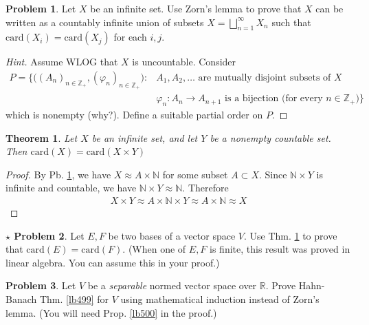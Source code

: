 \documentclass[12pt,b5paper,notitlepage]{article}
\theoremstyle{definition}
\newtheorem{prob}{\color{red}Problem}[section]
\newtheorem{sprob}[prob]{\color{red}$\star$ Problem}
\theoremstyle{plain}
\newtheorem{thm}[df]{Theorem}
\newcommand{\Nbb}{\mathbb N}
\newcommand{\Zbb}{\mathbb Z}
\newcommand{\Rbb}{\mathbb R}
\newcommand{\card}{\mathrm{card}}
\numberwithin{equation}{section}
\begin{document}
\begin{prob}\label{lb496}
Let $X$ be an infinite set. Use Zorn's lemma to prove that $X$ can be written as a countably infinite union  of subsets $X=\bigsqcup_{n=1}^\infty X_n$ such that $\card(X_i)=\card(X_j)$ for each $i,j$.
\end{prob}


\begin{proof}[Hint]
Assume WLOG that $X$ is uncountable. Consider
\begin{align*}
P=\Big\{\big((A_n)_{n\in\Zbb_+},(\varphi_n)_{n\in\Zbb_+} \big):&A_1,A_2,\dots\text{ are mutually disjoint subsets of }X\\
&\varphi_n:A_n\rightarrow A_{n+1}\text{ is a bijection (for every $n\in\Zbb_+$)}\Big\}
\end{align*}
which is nonempty (why?). Define a suitable partial order on $P$.
\end{proof}



\begin{thm}\label{lb497}
Let $X$ be an infinite set, and let $Y$ be a nonempty countable set. Then $\card(X)=\card(X\times Y)$
\end{thm}

\begin{proof}
By Pb. \ref{lb496}, we have $X\approx A\times\Nbb$ for some subset $A\subset X$. Since  $\Nbb\times Y$ is infinite and countable, we have $\Nbb\times Y\approx \Nbb$. Therefore
\begin{align*}
X\times Y\approx A\times \Nbb\times Y\approx A\times \Nbb\approx X
\end{align*}
\end{proof}


\begin{sprob}
Let $E,F$ be two bases of a vector space $V$. Use Thm. \ref{lb497} to prove that $\card(E)=\card(F)$. (When one of $E,F$ is finite, this result was proved in linear algebra. You can assume this in your proof.)
\end{sprob}

\begin{prob}\label{lb501}
Let $V$ be a  \textit{separable} normed vector space over $\Rbb$. Prove Hahn-Banach Thm. \ref{lb499} for $V$ using mathematical induction instead of Zorn's lemma. (You will need Prop. \ref{lb500} in the proof.)
\end{prob}





\newpage
\end{document}
